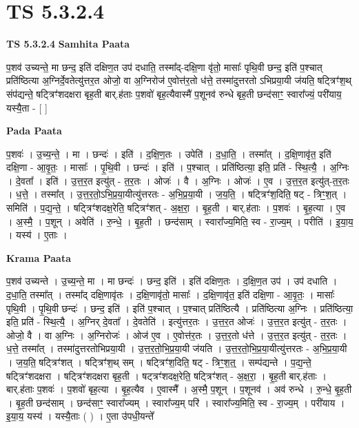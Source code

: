 \documentclass[17pt]{extarticle}
\begin{document}
\section{ TS 5.3.2.4 }

\textbf{TS 5.3.2.4 } \newline
\textbf{Samhita Paata} \newline

प॒शव॑ उच्यन्ते॒ मा छन्द॒ इति॑ दक्षिण॒त उप॑ दधाति॒ तस्मा᳚द्-दक्षि॒णा वृ॑तो॒ मासाः᳚ पृथि॒वी छन्द॒ इति॑ प॒श्चात् प्रति॑ष्ठित्या अ॒ग्निर्दे॒वतेत्यु॑त्तर॒त ओजो॒ वा अ॒ग्निरोज॑ ए॒वोत्त॑र॒तो ध॑त्ते॒ तस्मा॑दुत्तरतो ऽभिप्रया॒यी ज॑यति॒ षट्त्रिꣳ॑श॒थ् संप॑द्यन्ते॒ षट्त्रिꣳ॑शदक्षरा बृह॒ती बार्.ह॑ताः प॒शवो॑ बृह॒त्यैवास्मै॑ प॒शूनव॑ रुन्धे बृह॒ती छन्द॑साꣳ॒॒ स्वारा᳚ज्यं॒ परी॑याय॒ यस्यै॒ता - [  ] \newline

\textbf{Pada Paata} \newline

प॒शवः॑ । उ॒च्य॒न्ते॒ । मा । छन्दः॑ । इति॑ । द॒क्षि॒ण॒तः । उपेति॑ । द॒धा॒ति॒ । तस्मा᳚त् । द॒क्षि॒णावृ॑त॒ इति॑ दक्षि॒णा - आ॒वृ॒तः॒ । मासाः᳚ । पृ॒थि॒वी । छन्दः॑ । इति॑ । प॒श्चात् । प्रति॑ष्ठित्या॒ इति॒ प्रति॑ - स्थि॒त्यै॒ । अ॒ग्निः । दे॒वता᳚ । इति॑ । उ॒त्त॒र॒त इत्यु॑त् - त॒र॒तः । ओजः॑ । वै । अ॒ग्निः । ओजः॑ । ए॒व । उ॒त्त॒र॒त इत्यु॑त्-त॒र॒तः । ध॒त्ते॒ । तस्मा᳚त् । उ॒त्त॒र॒तो॒ऽभि॒प्र॒या॒यीत्यु॑त्तरतः - अ॒भि॒प्र॒या॒यी । ज॒य॒ति॒ । षट्त्रिꣳ॑श॒दिति॒ षट् - त्रिꣳ॒॒श॒त् । समिति॑ । प॒द्य॒न्ते॒ । षट्त्रिꣳ॑शदक्ष॒रेति॒ षट्त्रिꣳ॑शत् -   अ॒क्ष॒रा॒ । बृ॒ह॒ती । बार्.ह॑ताः । प॒शवः॑ । बृ॒ह॒त्या । ए॒व । अ॒स्मै॒ । प॒शून् । अवेति॑ । रु॒न्धे॒ । बृ॒ह॒ती । छन्द॑साम् । स्वारा᳚ज्य॒मिति॒ स्व - रा॒ज्य॒म् । परीति॑ । इ॒या॒य॒ । यस्य॑ । ए॒ताः ।  \newline


\textbf{Krama Paata} \newline

प॒शव॑ उच्यन्ते । उ॒च्य॒न्ते॒ मा । मा छन्दः॑ । छन्द॒ इति॑ । इति॑ दक्षिण॒तः । द॒क्षि॒ण॒त उप॑ । उप॑ दधाति । द॒धा॒ति॒ तस्मा᳚त् । तस्मा᳚द् दक्षि॒णावृ॑तः । द॒क्षि॒णावृ॑तो॒ मासाः᳚ । द॒क्षि॒णावृ॑त॒ इति॑ दक्षि॒णा - आ॒वृ॒तः॒ । मासाः᳚ पृथि॒वी । पृ॒थि॒वी छन्दः॑ । छन्द॒ इति॑ । इति॑ प॒श्चात् । प॒श्चात् प्रति॑ष्ठित्यै । प्रति॑ष्ठित्या अ॒ग्निः । प्रति॑ष्ठित्या॒ इति॒ प्रति॑ - स्थि॒त्यै॒ । अ॒ग्निर् दे॒वता᳚ । दे॒वतेति॑ । इत्यु॑त्तर॒तः । उ॒त्त॒र॒त ओजः॑ । उ॒त्त॒र॒त इत्यु॑त् - त॒र॒तः । ओजो॒ वै । वा अ॒ग्निः । अ॒ग्निरोजः॑ । ओज॑ ए॒व । ए॒वोत्त॑र॒तः । उ॒त्त॒र॒तो ध॑त्ते । उ॒त्त॒र॒त इत्यु॑त् - त॒र॒तः । ध॒त्ते॒ तस्मा᳚त् । तस्मा॑दुत्तरतोभिप्रया॒यी । उ॒त्त॒र॒तो॒भि॒प्र॒या॒यी ज॑यति । उ॒त्त॒र॒तो॒भि॒प्र॒या॒यीत्यु॑त्तरतः - अ॒भि॒प्र॒या॒यी । ज॒य॒ति॒ षट्त्रिꣳ॑शत् । षट्त्रिꣳ॑श॒थ् सम् । षट्त्रिꣳ॑श॒दिति॒ षट् - त्रिꣳ॒॒श॒त्॒ । सम्प॑द्यन्ते । प॒द्य॒न्ते॒ षट्त्रिꣳ॑शदक्षरा । षट्त्रिꣳ॑शदक्षरा बृह॒ती । षट्त्रꣳ॑शदक्ष॒रेति॒ षट्त्रिꣳ॑शत् - अ॒क्ष॒रा॒ । बृ॒ह॒ती बार्.ह॑ताः । बार्.ह॑ताः प॒शवः॑ । प॒शवो॑ बृह॒त्या । बृ॒ह॒त्यैव । ए॒वास्मै᳚ । अ॒स्मै॒ प॒शून् । प॒शूनव॑ । अव॑ रुन्धे । रु॒न्धे॒ बृ॒ह॒ती । बृ॒ह॒ती छन्द॑साम् । छन्द॑साꣳ॒॒ स्वारा᳚ज्यम् । स्वारा᳚ज्य॒म् परि॑ । स्वारा᳚ज्य॒मिति॒ स्व - रा॒ज्य॒म् । परी॑याय । इ॒या॒य॒ यस्य॑ । यस्यै॒ताः ( ) । ए॒ता उ॑पधी॒यन्ते᳚ \newline
\end{document}
